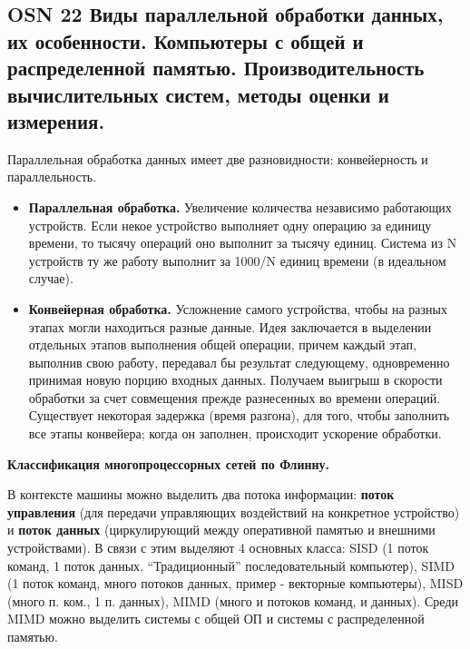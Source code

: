 \subsection{OSN 22 Виды параллельной обработки данных, их особенности. Компьютеры с общей и распределенной памятью. Производительность вычислительных систем, методы оценки и измерения.}


Параллельная обработка данных имеет две разновидности: конвейерность и параллельность.
\begin{itemize}
    \item \textbf{Параллельная обработка.} Увеличение количества независимо работающих устройств. Если некое устройство выполняет одну операцию за единицу времени, то тысячу операций оно выполнит за тысячу единиц. Система из N устройств ту же работу выполнит за 1000/N единиц времени (в идеальном случае).
    \item \textbf{Конвейерная обработка.} Усложнение самого устройства, чтобы на разных этапах могли находиться разные данные. Идея заключается в выделении отдельных этапов выполнения общей операции, причем каждый этап, выполнив свою работу, передавал бы результат следующему, одновременно принимая новую порцию входных данных. Получаем выигрыш в скорости обработки за счет совмещения прежде разнесенных во времени операций. Существует некоторая задержка (время разгона), для того, чтобы заполнить все этапы конвейера; когда он заполнен, происходит ускорение обработки.
\end{itemize}

\textbf{Классификация многопроцессорных сетей по Флинну.}

В контексте машины можно выделить два потока информации: \textbf{поток управления} (для передачи управляющих воздействий на конкретное устройство) и \textbf{поток данных} (циркулирующий между оперативной памятью и внешними устройствами). В связи с этим выделяют 4 основных класса: SISD (1 поток команд, 1 поток данных. ``Традиционный'' последовательный компьютер), SIMD (1 поток команд, много потоков данных, пример - векторные компьютеры), MISD (много п. ком., 1 п. данных), MIMD (много и потоков команд, и данных). Среди MIMD можно выделить системы с общей ОП и системы с распределенной памятью.

